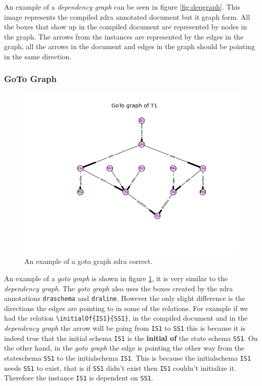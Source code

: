 An example of a \emph{dependency graph} can be seen in figure
\ref{fig:depgraph}. This image represents the compiled \gls{zdra} annotated
document but it graph form. All the boxes that show up in the compiled document
are represented by nodes in the graph. The arrows from the instances are
represented by the edges in the graph, all the arrows in the document and edges
in the graph should be pointing in the same direction.


\subsubsection{GoTo Graph}

\begin{figure}[H]
\centering
\includegraphics[scale=0.6]{Figures/zdra/gotograph.png}
\caption{An example of a goto graph \gls{zdra} correct. \label{fig:gotograph}}
\end{figure}

An example of a \emph{goto graph} is shown in figure \ref{fig:gotograph}, it is
very similar to the \emph{dependency graph}. The \emph{goto graph} also uses the
boxes created by the \gls{zdra} annotations \verb|draschema| and \verb|draline|.
However the only slight difference is the directions the edges are pointing to
in some of the relations. For example if we had the relation
\verb|\initialOf{IS1}{SS1}|, in the compiled document and in the
\emph{dependency graph} the arrow will be going from \verb|IS1| to \verb|SS1|
this is because it is indeed true that the initial schema \verb|IS1| is the
\textbf{initial of} the state schema \verb|SS1|. On the other hand, in the
\emph{goto graph} the edge is pointing the other way from the stateschema
\verb|SS1| to the initialschema \verb|IS1|. This is because the initialschema
\verb|IS1| needs \verb|SS1| to exist, that is if \verb|SS1| didn't exist then
\verb|IS1| couldn't initialize it. Therefore the instance \verb|IS1| is dependent
on \verb|SS1|.

